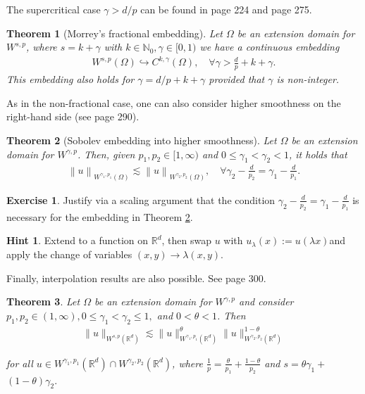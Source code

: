 \documentclass[
    a4paper,
    DIV=14,
    abstract=true,
    numbers=noenddot
]
{scrartcl}
\newtheorem{theorem}{Theorem}[section]
\theoremstyle{definition}
\newtheorem{exercise}{Exercise}
\newtheorem*{hint}{Hint}
\renewcommand{\norm}[1]{\left\lVert #1 \right\rVert}\renewcommand{\abs}[1]{\left| #1 \right|}
\newcommand{\N}{\mathbb{N}}
\newcommand{\R}{\mathbb{R}}
\begin{document}
The supercritical case $\gamma>d/p$ can be found in \cite{agranovich2015sobolev} page 224 and \cite{leoni2023first} page 275.
\begin{theorem}[Morrey's fractional embedding]\label{morrey embedding}
    Let $\Omega $ be an extension domain for $W^{s,p}$, where $s=k+ \gamma $ with $k \in \N_0, \gamma \in [0,1)$  we have a continuous embedding
    \begin{align*}
        W^{s,p}(\Omega) \hookrightarrow  C^{k,\gamma}(\Omega), \quad\forall \gamma> \frac{d}{p} + k+\gamma.
    \end{align*}
    This embedding also holds for $\gamma=d / p+k+\gamma$ provided that $\gamma $ is non-integer.
\end{theorem}
As in the non-fractional case, one can also consider higher smoothness on the right-hand side (see \cite{leoni2023first} page 290).
\begin{theorem}[Sobolev embedding into higher smoothness]\label{higher smoothness embedding}
    Let $\Omega $ be an extension domain for $W^{\gamma,p}$. Then, given $p_1, p_2 \in [1,\infty)$ and $0\leq \gamma_1<\gamma_2< 1$, it holds that
    \begin{align*}
        \norm{u}_{W^{\gamma_1,p_1}(\Omega )}\lesssim \norm{u}_{W^{\gamma_2,p_2}(\Omega )}, \quad\forall \gamma_2 - \frac{d}{p_2} = \gamma_1 - \frac{d}{p_1}.
    \end{align*}
\end{theorem}
\begin{exercise}
    Justify via a scaling argument that the condition $\gamma_2 - \frac{d}{p_2} = \gamma_1 - \frac{d}{p_1}$ is necessary for the embedding in Theorem \ref{higher smoothness embedding}.
\end{exercise}
\begin{hint}
    Extend to a function on $\R^d$, then swap  $u$ with $u_\lambda (x):=u(\lambda x)$and apply the change of variables $(x,y)\to \lambda (x,y)$.
\end{hint}
Finally, interpolation results are also possible. See \cite{leoni2023first} page 300.
\begin{theorem}\label{interpolation embedding}
    Let $\Omega $ be an extension domain for $W^{\gamma,p}$ and consider $p_1,p_2 \in (1,\infty), 0 \leq \gamma_1<\gamma_2 \leq 1,$  and $0<\theta<1$. Then
    \begin{align*}
        \|u\|_{W^{s, p}(\R^d)} \lesssim\|u\|_{W^{\gamma_1, p_1}(\R^d)}^\theta\|u\|_{W^{\gamma_2, p_2}(\R^d)}^{1-\theta}
    \end{align*}

    for all $u \in W^{\gamma_1, p_1}(\R^d) \cap W^{\gamma_2, p_2}(\R^d)$, where $\frac{1}{p}=\frac{\theta}{p_1}+\frac{1-\theta}{p_2}$ and $s=\theta \gamma_1+$ $(1-\theta) \gamma_2.$
\end{theorem}
\end{document}
